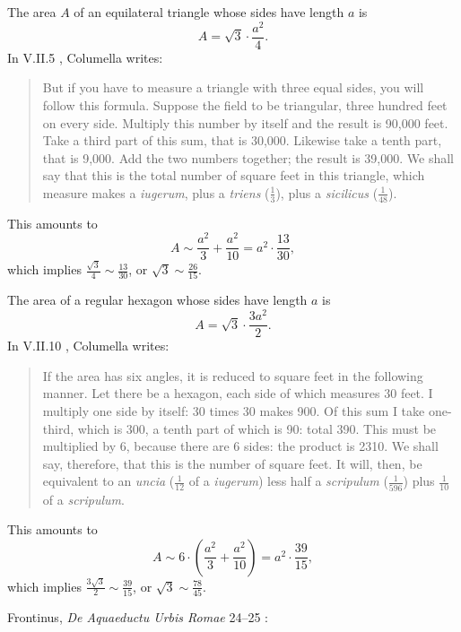 \documentclass{article}
\theoremstyle{definition}
\begin{document}
The area $A$ of an equilateral triangle whose sides have length $a$ is
\[
A=\sqrt{3} \cdot \frac{a^2}{4}.
\]
In V.II.5 \cite[pp.~15--17]{columellaII}, Columella writes:

\begin{quote}
But if you have to measure a triangle with three equal sides, you will follow this formula. Suppose the field to be triangular, three hundred feet on every side. Multiply this number by itself and the result is 90,000 feet. Take a third part of this sum, that is
30,000. Likewise take a tenth part, that is 9,000. Add the two numbers together; the result is 39,000. We shall say that this is the total number of square feet in this triangle, which measure makes a {\em iugerum}, plus a {\em triens} ($\frac{1}{3}$), plus a {\em sicilicus} ($\frac{1}{48}$).
\end{quote}

This amounts to 
\[
A \sim \frac{a^2}{3}+\frac{a^2}{10} = a^2 \cdot \frac{13}{30},
\]
which implies $\frac{\sqrt{3}}{4} \sim \frac{13}{30}$, or $\sqrt{3} \sim \frac{26}{15}$. 

The area of a regular hexagon whose sides have length $a$ is
\[
A = \sqrt{3} \cdot \frac{3a^2}{2}.
\]
In V.II.10 \cite[pp.~21--23]{columellaII}, Columella writes:

\begin{quote}
If the area has six angles, it is reduced to square  feet in the following manner. Let there be a hexagon, each side of which measures 30 feet. I multiply one side by itself:
30 times 30 makes 900. Of this sum I take one-third, which is 300, a tenth part of which is 90: total 390. This must be multiplied
by 6, because there are 6 sides: the product is 2310. We shall say, therefore, that this is the number of square feet. It will, then, be equivalent to an {\em uncia}
($\frac{1}{12}$ of a {\em iugerum}) less half a {\em scripulum} ($\frac{1}{596}$) plus $\frac{1}{10}$ of a {\em scripulum}.
\end{quote}

This amounts to
\[
A \sim 6 \cdot \left( \frac{a^2}{3}+\frac{a^2}{10} \right) = a^2 \cdot \frac{39}{15},
\]
which implies $\frac{3\sqrt{3}}{2} \sim  \frac{39}{15}$, or $\sqrt{3} \sim \frac{78}{45}$. 

Frontinus, {\em De Aquaeductu Urbis Romae} 24--25 \cite{rodgers}:
\end{document}
